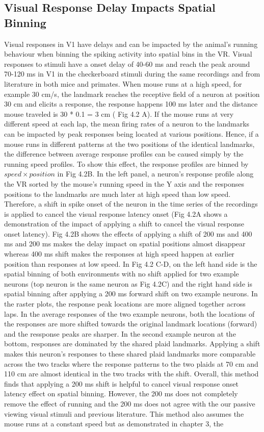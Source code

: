 \subsection{Visual Response Delay Impacts Spatial Binning}
Visual responses in V1 have delays and can be impacted by the animal's running behaviour when binning the spiking activity into spatial bins in the VR. Visual responses to stimuli have a onset delay of 40-60 ms and reach the peak around 70-120 ms in V1 in the checkerboard stimuli during the same recordings and from literature in both mice and primates. When mouse runs at a high speed, for example 30 cm/s, the landmark reaches the receptive field of a neuron at position 30 cm and elicits a response, the response happens 100 ms later and the distance mouse traveled is 30 * 0.1 = 3 cm ( Fig 4.2 A). If the mouse runs at very different speed at each lap, the mean firing rates of a neuron to the landmarks can be impacted by peak responses being located at various positions. Hence, if a mouse runs in different patterns at the two positions of the identical landmarks, the difference between average response profiles can be caused simply by the running speed profiles. To show this effect, the response profiles are binned by \(speed \times position\) in Fig 4.2B. In the left panel, a neuron's response profile along the VR sorted by the mouse's running speed in the Y axis and the responses positions to the landmarks are much later at high speed than low speed. Therefore, a shift in spike onset of the neuron in the time series of the recordings is applied to cancel the visual response latency onset (Fig 4.2A shows a demonstration of the impact of applying a shift to cancel the visual response onset latency). Fig 4.2B shows the effects of applying a shift of 200 ms and 400 ms and 200 ms makes the delay impact on spatial positions almost disappear whereas 400 ms shift makes the responses at high speed happen at earlier position than responses at low speed. In Fig 4.2 C-D, on the left hand side is the spatial binning of both environments with no shift applied for two example neurons (top neuron is the same neuron as Fig 4.2C) and the right hand side is spatial binning after applying a 200 ms forward shift on two example neurons. In the raster plots, the response peak locations are more aligned together across laps. In the average responses of the two example neurons, both the locations of the responses are more shifted towards the original landmark locations (forward) and the ressponse peaks are sharper. In the second example neuron at the bottom, responses are dominated by the shared plaid landmarks. Applying a shift makes this neuron's responses to these shared plaid landmarks more comparable across the two tracks where the response patterns to the two plaids at 70 cm and 110 cm are almost identical in the two tracks with the shift. Overall, this method finds that applying a 200 ms shift is helpful to cancel visual response onset latency effect on spatial binning. However, the 200 ms does not completely remove the effect of running and the 200 ms does not agree with the our passive viewing visual stimuli and previous literature. This method also assumes the mouse runs at a constant speed but as demonstrated in chapter 3, the 